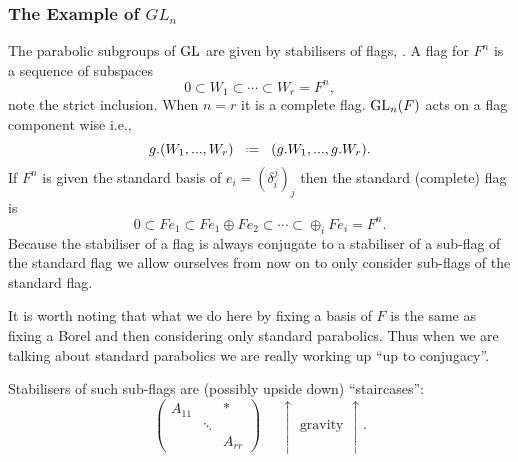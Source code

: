 \subsubsection{The Example of \(GL_n\)}
    The parabolic subgroups of \(\operatorname{GL}\) are given by stabilisers of flags, \cite[Exercise 3.2.16, 6.2.11]{springerLinearAlgebraicGroups1998}\cite{conradStandardParabolicSubgroups}.
    A flag for \(F^n\) is a sequence of subspaces
    \[0\subset W_1 \subset \cdots \subset W_r = F^n,\]
    note the strict inclusion. When \(n = r\) it is a complete flag. \(\operatorname{GL}_n(F)\) acts on a flag component wise i.e.,
    \[g.(W_1, ..., W_r) \defeq (g.W_1, ..., g.W_r).\]
    If \(F^n\) is given the standard basis of \(e_i = (\delta_i^j)_j\) then the standard (complete) flag is 
    \[0 \subset Fe_1 \subset Fe_1 \oplus Fe_2 \subset \cdots \subset \oplus_i Fe_i = F^n.\]
    Because the stabiliser of a flag is always conjugate to a stabiliser of a sub-flag of the standard flag we allow ourselves from now on to only consider sub-flags of the standard flag. 
    
    \begin{Remark}
        It is worth noting that what we do here by fixing a basis of \(F\) is the same as fixing a Borel and then considering only standard parabolics. Thus when we are talking about standard parabolics we are really working up ``up to conjugacy''.
    \end{Remark}
    
    Stabilisers of such sub-flags are (possibly upside down) ``staircases'':
    \[\begin{pmatrix}
        A_{11} && \ast\\
         & \ddots & \\
         && A_{rr} 
    \end{pmatrix}   \;\;\;\;\; \uparrow \text{ gravity }\uparrow .\]


